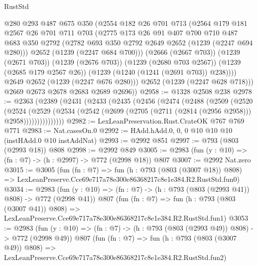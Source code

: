 \begin{lexlean}{RustStd}
\begin{coremodule}
            @280
            @293
            @487
            @675
            @350
            (@2554
              @182
              @26
              @701
              @713
              (@2564
                @179
                @181
                @2567
                @26
                @701
                @711
                @703
                (@2775
                  @173
                  @26
                  @91
                  @407
                  @700
                  @710
                  @487
                  @683
                  @350
                  @2792
                  (@2782 @693 @350 @2792 @2649 @2652 (@1239 (@2247 @694 @280)))
                  @2652
                  (@1239 (@2247 @684 @700)))
                (@2666 (@2667 @703))
                (@1239 (@2671 @703))
                (@1239 (@2676 @703))
                (@1239 (@2680 @703 @2567))
                (@1239 (@2685 @179 @2567 @26))
                (@1239 (@1240 (@1241 (@2691 @703)) @238))))
            @2649
            @2652
            (@1239 (@2247 @676 @280)))
          @2652
          (@1239 (@2247 @628 @718)))
        @2669
        @2673
        @2678
        @2683
        @2689
        @2696))
@2958 := @1328 @2508 @238
@2978 := @2363
    (@2389
      (@2431
        (@2433
          (@2435
            (@2456
              (@2474
                (@2488
                  (@2509
                    (@2520
                      (@2524
                        (@2529
                          (@2534
                            (@2542 (@2699 (@2705 (@2711 (@2814 (@2956 @2958))) @2958)))))))))))))))
@2982 := LexLeanPreservation.Rust.CrateOK @767 @769 @771
@2983 := Nat.casesOn.{0}
@2992 := HAdd.hAdd.{0, 0, 0} @10 @10 @10 (instHAdd.{0} @10 instAddNat)
@2993 := @2992 @851
@2997 := @793 (@803 (@2993 @18)) @808
@2998 := @2992 @849
@3005 := @2983 (fun (y : @10) => (fn : @7) -> (h : @2997) -> @772 (@2998 @18)) @807
@3007 := @2992 Nat.zero
@3015 := @3005
    (fun (fn : @7) =>
    fun (h : @793 (@803 (@3007 @18)) @808) =>
    LexLeanPreserve.Cce69e717a78e300e86368217c8e1e384.R2.RustStd.fun0)
@3034 := @2983
    (fun (y : @10) => (fn : @7) -> (h : @793 (@803 (@2993 @41)) @808) -> @772 (@2998 @41))
    @807
    (fun (fn : @7) =>
    fun (h : @793 (@803 (@3007 @41)) @808) =>
    LexLeanPreserve.Cce69e717a78e300e86368217c8e1e384.R2.RustStd.fun1)
@3053 := @2983
    (fun (y : @10) => (fn : @7) -> (h : @793 (@803 (@2993 @49)) @808) -> @772 (@2998 @49))
    @807
    (fun (fn : @7) =>
    fun (h : @793 (@803 (@3007 @49)) @808) =>
    LexLeanPreserve.Cce69e717a78e300e86368217c8e1e384.R2.RustStd.fun2)

\end{coremodule}
\end{lexlean}
